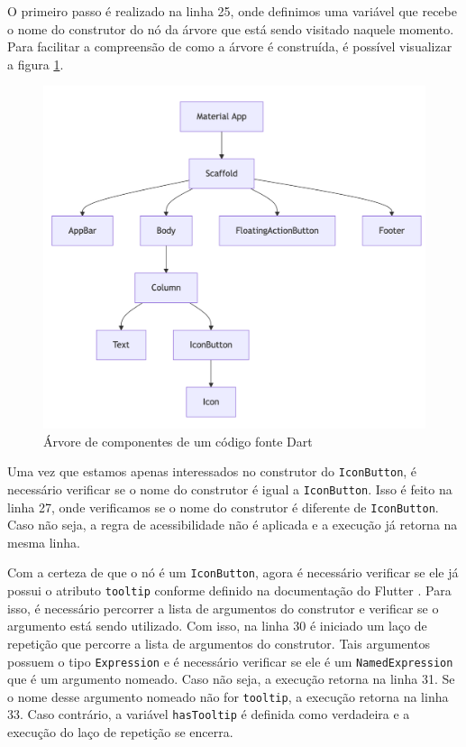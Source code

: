 O primeiro passo é realizado na linha 25, onde definimos uma variável  que recebe o nome do construtor do nó da árvore que está sendo visitado naquele momento. Para facilitar a compreensão de como a árvore é construída, é possível visualizar a figura \ref{fig:flutter-component-tree}.

\begin{figure}[!htbp]
	\centering
	\caption{Árvore de componentes de um código fonte Dart}
	\label{fig:flutter-component-tree}
	\includegraphics[width=325pt]{Assets/FlutterComponentTree.png}
\end{figure}

Uma vez que estamos apenas interessados no construtor do \texttt{IconButton}, é necessário verificar se o nome do construtor é igual a \texttt{IconButton}. Isso é feito na linha 27, onde verificamos se o nome do construtor é diferente de \texttt{IconButton}. Caso não seja, a regra de acessibilidade não é aplicada e a execução já retorna na mesma linha.

Com a certeza de que o nó é um \texttt{IconButton}, agora é necessário verificar se ele já possui o atributo \texttt{tooltip} conforme definido na documentação do Flutter \cite{flutter}. Para isso, é necessário percorrer a lista de argumentos do construtor e verificar se o argumento está sendo utilizado. Com isso, na linha 30 é iniciado um laço de repetição que percorre a lista de argumentos do construtor. Tais argumentos possuem o tipo \texttt{Expression} e é necessário verificar se ele é um \texttt{NamedExpression} que é um argumento nomeado. Caso não seja, a execução retorna na linha 31. Se o nome desse argumento nomeado não for \texttt{tooltip}, a execução retorna na linha 33. Caso contrário, a variável \texttt{hasTooltip} é definida como verdadeira e a execução do laço de repetição se encerra.

